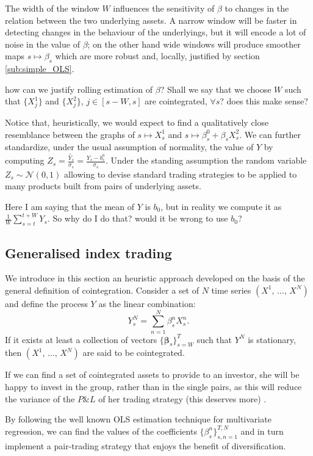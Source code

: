 \documentclass[a4paper,11pt]{article}
\theoremstyle{remark}
\theoremstyle{plain}
\newcommand\ab[1]{{\color{blue} #1 }}
\begin{document}
The width of the window $W$ influences the sensitivity of $\beta$ to changes in the relation between the two underlying assets. A narrow window will be faster in detecting changes in the behaviour of the underlyings, but it will encode a lot of noise in the value of $\beta$; on the other hand wide windows will produce smoother maps $s\mapsto\beta_s$ which are more robust and, locally, justified by section \ref{sub:simple_OLS}.

\ab{how can we justify rolling estimation of $\beta$? Shall we say that we choose $W$ such that $\{X^1_j\}$ and  $\{X^2_j\}$, $j\in[s-W,s]$ are cointegrated, $\forall s$? does this make sense?  }

Notice that, heuristically, we would expect to find a qualitatively close resemblance between the graphs of $s\mapsto X^1_s$ and $s\mapsto \beta^0_s+\beta_s X^2_s$. We can further standardize, under the usual assumption of normality, the value of $Y$ by computing $Z_s=\frac{\hat{Y}_s}{\sigma_s}=\frac{Y_s-b^0_s}{\sigma_s}$. Under the standing assumption the random variable $Z_s\sim\mathcal{N}(0,1)$ allowing to devise standard trading strategies to be applied to many products built from pairs of underlying assets.

\ab{Here I am saying that the mean of $Y$ is $b_0$, but in reality we compute it as $\frac{1}{W}\sum_{s=t}^{t+W} Y_s$. So why do I do that? would it be wrong to use $b_0$? }

\subsection{Generalised index trading}
\label{sec:index}
We introduce in this section an heuristic approach developed on the basis of the general definition of cointegration. Consider a set of $N$ time series $(X^1,\,\dots,\,X^N)$ and define the process $Y$ as the linear combination:
\[
Y^N_s=\sum_{n=1}^{N}\beta^n_s X^n_s.
\]
If it exists at least a collection of vectors $\{\boldsymbol{\beta}_s\}_{s=W}^{T}$ such that $Y^N$ is stationary, then $(X^1,\,\dots,\,X^N)$ are said to be cointegrated.

If we can find a set of cointegrated assets to provide to an investor, she will be happy to invest in the group, rather than in the single pairs, as this will reduce the variance of the $P\&L$ of her trading strategy \ab{(this deserves more)}. 

By following the well known OLS estimation technique for multivariate regression, we can find the values of the coefficients $\{\beta_s^n\}_{s,n=1}^{T,N}$ and in turn implement a pair-trading strategy that enjoys the benefit of diversification.
\end{document}
